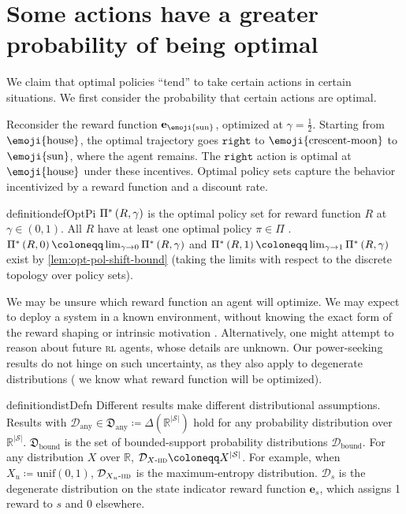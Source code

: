 \documentclass{article}
\renewcommand{\abs}[1]{\left|#1\right|}
\newcommand*{\defeq}{\coloneqq} %
\newcommand*{\reals}{\mathbb{R}}
\newcommand*{\unitvec}[1][s]{\mathbf{e}_{#1}}
\newcommand*{\rl}[1][r]{{\textsc{#1l}}}
\newcommand*{\St}{\mathcal{S}}
\newcommand*{\rewardVS}{\reals^{\abs{\St}}} %
\newcommand*{\optPi}{\piSet[*]}
\newcommand*{\Dist}{X} %
\newcommand*{\D}{\mathcal{D}} %
\newcommand*{\distSet}{\mathfrak{D}}
\newcommand*{\Dany}{\D_{\text{any}}}
\newcommand*{\DSetAny}{\distSet_\text{any}}
\newcommand*{\Dbd}{\D_{\text{bound}}}
\newcommand*{\DSetBd}{\distSet_\text{bound}}
\newcommand*{\half}{\frac{1}{2}}
\theoremstyle{definition}
\newcommand*{\start}{\text{\emoji{house}}}
\newcommand*{\farright}{\text{\emoji{sun}}}
\newcommand*{\closeright}{\text{\emoji{crescent-moon}}}
\newcommand*{\start}{\star}
\newcommand*{\farright}{r_{\searrow}}
\newcommand*{\closeright}{r_\triangleright}
\newcommand*{\rightA}{\texttt{right}}
\begin{document}
\section{Some actions have a greater probability of being optimal}\label{sec:action-prob}
We claim that optimal policies ``tend'' to take certain actions in certain situations. We first consider the probability that certain actions are optimal.

Reconsider the reward function $\unitvec[\farright]$, optimized at $\gamma=\half$. Starting from $\start$, the optimal trajectory goes $\rightA$ to $\closeright$ to $\farright$, where the agent remains. The $\rightA$ action is optimal at $\start$ under these incentives. Optimal policy sets capture the behavior incentivized by a reward function and a discount rate.

\begin{restatable}{definition}{defOptPi}\label{def:opt-fn}
$\optPi$ is the optimal policy set for reward function $R$ at $\gamma\in(0,1)$. All $R$ have at least one optimal policy $\pi\in\Pi$ \citep{puterman_markov_2014}. $\optPi[R,0]\defeq \lim_{\gamma\to 0} \optPi$ and $\optPi[R,1]\defeq \lim_{\gamma\to 1} \optPi$ exist by \cref{lem:opt-pol-shift-bound} (taking the limits with respect to the discrete topology over policy sets).
\end{restatable} 

We may be unsure which reward function an agent will optimize. We may expect to deploy a system in a known environment, without knowing the exact form of \eg{} the reward shaping \citep{Ng99policyinvariance} or intrinsic motivation \citep{pathakICMl17curiosity}. Alternatively, one might attempt to reason about future {\rl} agents, whose details are unknown. Our power-seeking results do not hinge on such uncertainty, as they also apply to degenerate distributions (\ie{} we know what reward function will be optimized). 

\begin{restatable}{definition}{distDefn}\label{def:dist}
Different results make different distributional assumptions. Results with $\Dany \in \DSetAny\defeq \Delta(\rewardVS)$ hold for any probability distribution over $\rewardVS$. $\DSetBd$ is the set of bounded-support probability distributions $\Dbd$. For any distribution $\Dist$ over $\reals$, $\Diid\defeq \Dist^{\abs{\St}}$.  For example, when $\Dist_u\defeq \text{unif}(0,1)$, $\Diid[\Dist_u]$ is the maximum-entropy distribution. $\D_s$ is the degenerate distribution on the state indicator reward function $\unitvec$, which assigns 1 reward to $s$ and 0 elsewhere.
\end{restatable} 
\end{document}
